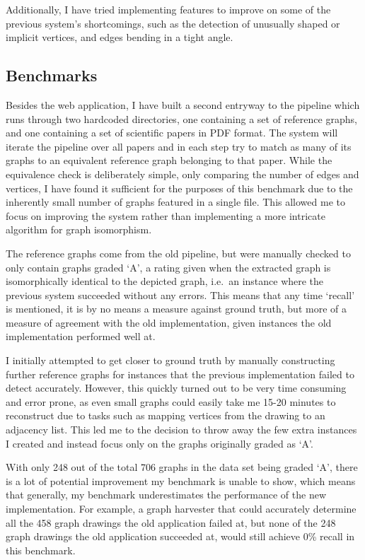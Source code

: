 \documentclass[practical,english]{info1thesis}
\begin{document}
Additionally, I have tried implementing features to improve on some of the previous system's shortcomings, such as the detection of unusually shaped or implicit vertices, and edges bending in a tight angle.

\subsection{Benchmarks}
Besides the web application, I have built a second entryway to the pipeline which runs through two hardcoded directories, one containing a set of reference graphs, and one containing a set of scientific papers in PDF format.
The system will iterate the pipeline over all papers and in each step try to match as many of its graphs to an equivalent reference graph belonging to that paper. 
While the equivalence check is deliberately simple, only comparing the number of edges and vertices, I have found it sufficient for the purposes of this benchmark due to the inherently small number of graphs featured in a single file.
This allowed me to focus on improving the system rather than implementing a more intricate algorithm for graph isomorphism.


The reference graphs come from the old pipeline, but were manually checked to only contain graphs graded `A', a rating given when the extracted graph is isomorphically identical to the depicted graph, i.e.~an instance where the previous system succeeded without any errors.
This means that any time `recall' is mentioned, it is by no means a measure against ground truth, but more of a measure of agreement with the old implementation, given instances the old implementation performed well at.


I initially attempted to get closer to ground truth by manually constructing further reference graphs for instances that the previous implementation failed to detect accurately.
However, this quickly turned out to be very time consuming and error prone, as even small graphs could easily take me 15-20 minutes to reconstruct due to tasks such as mapping vertices from the drawing to an adjacency list.
This led me to the decision to throw away the few extra instances I created and instead focus only on the graphs originally graded as `A'.


With only 248 out of the total 706 graphs in the data set being graded `A', there is a lot of potential improvement my benchmark is unable to show, which means that generally, my benchmark underestimates the performance of the new implementation.
For example, a graph harvester that could accurately determine all the 458 graph drawings the old application failed at, but none of the 248 graph drawings the old application succeeded at, would still achieve 0\% recall in this benchmark.
\end{document}

